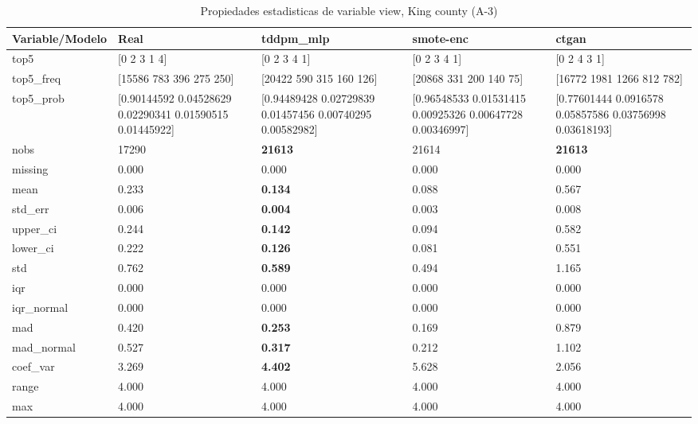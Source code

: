 \begin{table}[H]
\centering
\fontsize{8}{14}\selectfont
\caption{Propiedades  estadisticas de variable view, King county (A-3)}
\label{table-stats-king county-a-3-view}
\begin{tabular}{|l|m{10em}|m{10em}|m{10em}|m{10em}|}
\hline
 \rowcolor[gray]{0.8}
Variable/Modelo & Real & tddpm\_mlp & smote-enc & ctgan \\
\hline top5 & [0 2 3 1 4] & [0 2 3 4 1] & [0 2 3 4 1] & [0 2 4 3 1] \\
\hline top5\_freq & [15586   783   396   275   250] & [20422   590   315   160   126] & [20868   331   200   140    75] & [16772  1981  1266   812   782] \\
\hline top5\_prob & [0.90144592 0.04528629 0.02290341 0.01590515 0.01445922] & [0.94489428 0.02729839 0.01457456 0.00740295 0.00582982] & [0.96548533 0.01531415 0.00925326 0.00647728 0.00346997] & [0.77601444 0.0916578  0.05857586 0.03756998 0.03618193] \\
\hline nobs & 17290 & \bfseries 21613 & \cellcolor[rgb]{0.9, 0.54, 0.52} 21614 & \bfseries 21613 \\
\hline missing & 0.000 & 0.000 & 0.000 & 0.000 \\
\hline mean & 0.233 & \bfseries 0.134 & 0.088 & \cellcolor[rgb]{0.9, 0.54, 0.52} 0.567 \\
\hline std\_err & 0.006 & \bfseries 0.004 & \cellcolor[rgb]{0.9, 0.54, 0.52} 0.003 & 0.008 \\
\hline upper\_ci & 0.244 & \bfseries 0.142 & 0.094 & \cellcolor[rgb]{0.9, 0.54, 0.52} 0.582 \\
\hline lower\_ci & 0.222 & \bfseries 0.126 & 0.081 & \cellcolor[rgb]{0.9, 0.54, 0.52} 0.551 \\
\hline std & 0.762 & \bfseries 0.589 & 0.494 & \cellcolor[rgb]{0.9, 0.54, 0.52} 1.165 \\
\hline iqr & 0.000 & 0.000 & 0.000 & 0.000 \\
\hline iqr\_normal & 0.000 & 0.000 & 0.000 & 0.000 \\
\hline mad & 0.420 & \bfseries 0.253 & 0.169 & \cellcolor[rgb]{0.9, 0.54, 0.52} 0.879 \\
\hline mad\_normal & 0.527 & \bfseries 0.317 & 0.212 & \cellcolor[rgb]{0.9, 0.54, 0.52} 1.102 \\
\hline coef\_var & 3.269 & \bfseries 4.402 & \cellcolor[rgb]{0.9, 0.54, 0.52} 5.628 & 2.056 \\
\hline range & 4.000 & 4.000 & 4.000 & 4.000 \\
\hline max & 4.000 & 4.000 & 4.000 & 4.000 \\

\end{tabular}
\end{table}
